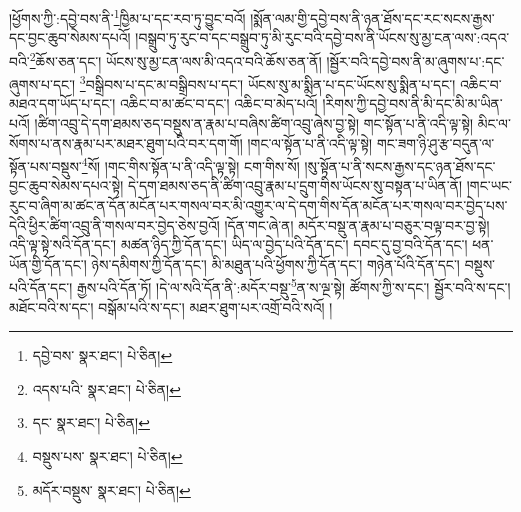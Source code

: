 །ཕྱོགས་ཀྱི་:དབྱེ་བས་ནི་\footnote{དབྱེ་བས་  སྣར་ཐང་།  པེ་ཅིན། }ཁྱིམ་པ་དང་རབ་ཏུ་བྱུང་བའོ། །སྨོན་ལམ་གྱི་དབྱེ་བས་ནི་ཉན་ཐོས་དང་རང་སངས་རྒྱས་དང་བྱང་ཆུབ་སེམས་དཔའོ། །བསྒྲུབ་ཏུ་རུང་བ་དང་བསྒྲུབ་ཏུ་མི་རུང་བའི་དབྱེ་བས་ནི་ཡོངས་སུ་མྱ་ངན་ལས་:འདའ་བའི་\footnote{འདས་པའི་  སྣར་ཐང་།  པེ་ཅིན། }ཆོས་ཅན་དང་། ཡོངས་སུ་མྱ་ངན་ལས་མི་འདའ་བའི་ཆོས་ཅན་ནོ། །སྦྱོར་བའི་དབྱེ་བས་ནི་མ་ཞུགས་པ་:དང་ཞུགས་པ་དང་། \footnote{དང་  སྣར་ཐང་།  པེ་ཅིན། }བསྒྲིབས་པ་དང་མ་བསྒྲིབས་པ་དང་། ཡོངས་སུ་མ་སྨིན་པ་དང་ཡོངས་སུ་སྨིན་པ་དང་། འཆིང་བ་མཐའ་དག་ཡོད་པ་དང་། འཆིང་བ་མ་ཚང་བ་དང་། འཆིང་བ་མེད་པའོ། །རིགས་ཀྱི་དབྱེ་བས་ནི་མི་དང་མི་མ་ཡིན་པའོ། །ཚིག་འབྲུ་དེ་དག་ཐམས་ཅད་བསྡུས་ན་རྣམ་པ་བཞིས་ཚིག་འབྲུ་ཞེས་བྱ་སྟེ། གང་སྟོན་པ་ནི་འདི་ལྟ་སྟེ། མིང་ལ་སོགས་པ་ནས་རྣམ་པར་མཐར་ཐུག་པའི་བར་དག་གོ། །གང་ལ་སྟོན་པ་ནི་འདི་ལྟ་སྟེ། གང་ཟག་ཉི་ཤུ་རྩ་བདུན་ལ་སྟོན་པས་བསྡུས་\footnote{བསྡུས་པས་  སྣར་ཐང་།  པེ་ཅིན། }སོ། །གང་གིས་སྟོན་པ་ནི་འདི་ལྟ་སྟེ། ངག་གིས་སོ། །སུ་སྟོན་པ་ནི་སངས་རྒྱས་དང་ཉན་ཐོས་དང་བྱང་ཆུབ་སེམས་དཔའ་སྟེ། དེ་དག་ཐམས་ཅད་ནི་ཚིག་འབྲུ་རྣམ་པ་དྲུག་གིས་ཡོངས་སུ་བསྟན་པ་ཡིན་ནོ། །གང་ཡང་རུང་བ་ཞིག་མ་ཚང་ན་དོན་མངོན་པར་གསལ་བར་མི་འགྱུར་ལ་དེ་དག་གིས་དོན་མངོན་པར་གསལ་བར་བྱེད་པས་དེའི་ཕྱིར་ཚིག་འབྲུ་ནི་གསལ་བར་བྱེད་ཅེས་བྱའོ། །དོན་གང་ཞེ་ན། མདོར་བསྡུ་ན་རྣམ་པ་བཅུར་བལྟ་བར་བྱ་སྟེ། འདི་ལྟ་སྟེ་སའི་དོན་དང་། མཚན་ཉིད་ཀྱི་དོན་དང་། ཡིད་ལ་བྱེད་པའི་དོན་དང་། དབང་དུ་བྱ་བའི་དོན་དང་། ཕན་ཡོན་གྱི་དོན་དང་། ཉེས་དམིགས་ཀྱི་དོན་དང་། མི་མཐུན་པའི་ཕྱོགས་ཀྱི་དོན་དང་། གཉེན་པོའི་དོན་དང་། བསྡུས་པའི་དོན་དང་། རྒྱས་པའི་དོན་ཏོ། །དེ་ལ་སའི་དོན་ནི་:མདོར་བསྡུ་\footnote{མདོར་བསྡུས་  སྣར་ཐང་།  པེ་ཅིན། }ན་ས་ལྔ་སྟེ། ཚོགས་ཀྱི་ས་དང་། སྦྱོར་བའི་ས་དང་། མཐོང་བའི་ས་དང་། བསྒོམ་པའི་ས་དང་། མཐར་ཐུག་པར་འགྲོ་བའི་སའོ། །
